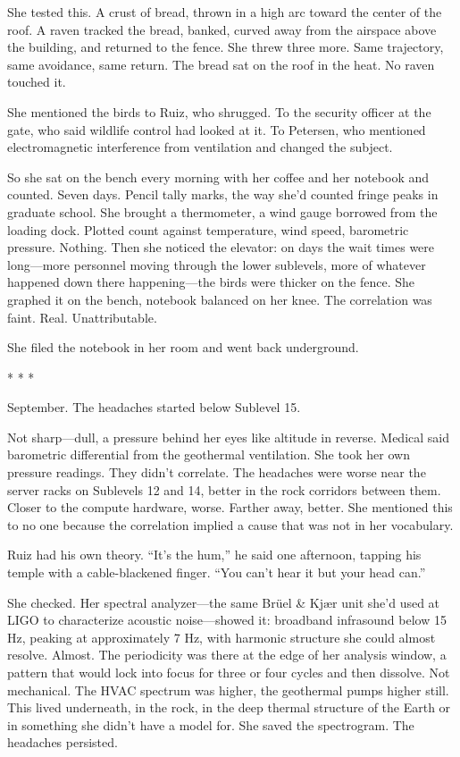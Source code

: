 \documentclass[12pt]{article}
\newcommand{\scenebreak}{\begin{center}* * *\end{center}}
\begin{document}
She tested this. A crust of bread, thrown in a high arc toward the center of the roof. A raven tracked the bread, banked, curved away from the airspace above the building, and returned to the fence. She threw three more. Same trajectory, same avoidance, same return. The bread sat on the roof in the heat. No raven touched it.

She mentioned the birds to Ruiz, who shrugged. To the security officer at the gate, who said wildlife control had looked at it. To Petersen, who mentioned electromagnetic interference from ventilation and changed the subject.

So she sat on the bench every morning with her coffee and her notebook and counted. Seven days. Pencil tally marks, the way she'd counted fringe peaks in graduate school. She brought a thermometer, a wind gauge borrowed from the loading dock. Plotted count against temperature, wind speed, barometric pressure. Nothing. Then she noticed the elevator: on days the wait times were long---more personnel moving through the lower sublevels, more of whatever happened down there happening---the birds were thicker on the fence. She graphed it on the bench, notebook balanced on her knee. The correlation was faint. Real. Unattributable.

She filed the notebook in her room and went back underground.

\scenebreak

September. The headaches started below Sublevel 15.

Not sharp---dull, a pressure behind her eyes like altitude in reverse. Medical said barometric differential from the geothermal ventilation. She took her own pressure readings. They didn't correlate. The headaches were worse near the server racks on Sublevels 12 and 14, better in the rock corridors between them. Closer to the compute hardware, worse. Farther away, better. She mentioned this to no one because the correlation implied a cause that was not in her vocabulary.

Ruiz had his own theory. ``It's the hum,'' he said one afternoon, tapping his temple with a cable-blackened finger. ``You can't hear it but your head can.''

She checked. Her spectral analyzer---the same Br\"{u}el \& Kj\ae r unit she'd used at LIGO to characterize acoustic noise---showed it: broadband infrasound below 15 Hz, peaking at approximately 7 Hz, with harmonic structure she could almost resolve. Almost. The periodicity was there at the edge of her analysis window, a pattern that would lock into focus for three or four cycles and then dissolve. Not mechanical. The HVAC spectrum was higher, the geothermal pumps higher still. This lived underneath, in the rock, in the deep thermal structure of the Earth or in something she didn't have a model for. She saved the spectrogram. The headaches persisted.
\end{document}
